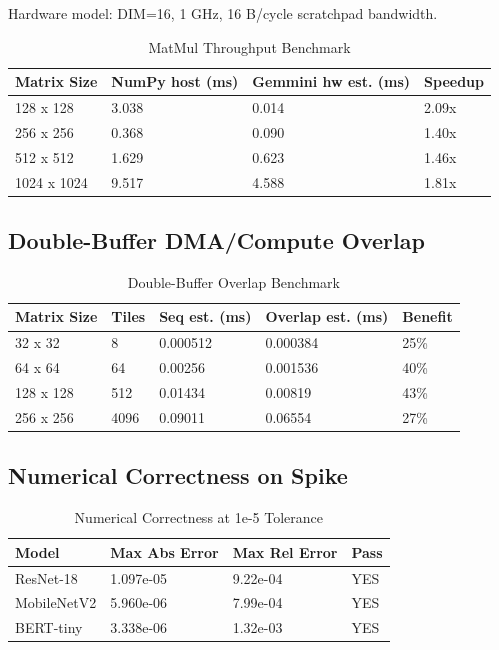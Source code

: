 \documentclass[12pt,a4paper]{article}
\begin{document}
Hardware model: DIM=16, 1 GHz, 16 B/cycle scratchpad bandwidth.

\begin{table}[H]
\centering
\begin{tabular}{|p{}|p{}|p{}|p{}|}
\hline
\textbf{Matrix Size} & \textbf{NumPy host (ms)} & \textbf{Gemmini hw est. (ms)} & \textbf{Speedup} \\
\hline
128 x 128 & 3.038 & 0.014 & 2.09x \\
\hline
256 x 256 & 0.368 & 0.090 & 1.40x \\
\hline
512 x 512 & 1.629 & 0.623 & 1.46x \\
\hline
1024 x 1024 & 9.517 & 4.588 & 1.81x \\
\hline
\end{tabular}
\caption{MatMul Throughput Benchmark}
\end{table}

\subsection{Double-Buffer DMA/Compute Overlap}

\begin{table}[H]
\centering
\begin{tabular}{|p{}|p{}|p{}|p{}|p{}|}
\hline
\textbf{Matrix Size} & \textbf{Tiles} & \textbf{Seq est. (ms)} & \textbf{Overlap est. (ms)} & \textbf{Benefit} \\
\hline
32 x 32 & 8 & 0.000512 & 0.000384 & 25\% \\
\hline
64 x 64 & 64 & 0.00256 & 0.001536 & 40\% \\
\hline
128 x 128 & 512 & 0.01434 & 0.00819 & 43\% \\
\hline
256 x 256 & 4096 & 0.09011 & 0.06554 & 27\% \\
\hline
\end{tabular}
\caption{Double-Buffer Overlap Benchmark}
\end{table}

\subsection{Numerical Correctness on Spike}

\begin{table}[H]
\centering
\begin{tabular}{|p{}|p{}|p{}|p{}|}
\hline
\textbf{Model} & \textbf{Max Abs Error} & \textbf{Max Rel Error} & \textbf{Pass} \\
\hline
ResNet-18 & 1.097e-05 & 9.22e-04 & YES \\
\hline
MobileNetV2 & 5.960e-06 & 7.99e-04 & YES \\
\hline
BERT-tiny & 3.338e-06 & 1.32e-03 & YES \\
\hline
\end{tabular}
\caption{Numerical Correctness at 1e-5 Tolerance}
\end{table}
\end{document}
